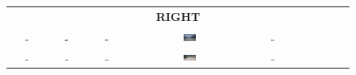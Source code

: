 \begin{figure}
\begin{tabular}{cccccccccc}
        \multicolumn{10}{c}{\textbf{RIGHT}} \\
        \includegraphics[width=0.1\textwidth]{img/diversity/right_01.png} &
        \includegraphics[width=0.1\textwidth]{img/diversity/right_02.png} &
        \includegraphics[width=0.1\textwidth]{img/diversity/right_03.png} &
        \includegraphics[width=0.1\textwidth]{img/diversity/right_04.png} &
        \includegraphics[width=0.1\textwidth]{img/diversity/right_05.png} & \\
        \includegraphics[width=0.1\textwidth]{img/diversity/right_06.png} &
        \includegraphics[width=0.1\textwidth]{img/diversity/right_07.png} &
        \includegraphics[width=0.1\textwidth]{img/diversity/right_08.png} &
        \includegraphics[width=0.1\textwidth]{img/diversity/right_09.png} &
        \includegraphics[width=0.1\textwidth]{img/diversity/right_10.png} \\
    \end{tabular}
    \label{fig:dataset_diversity}
\end{figure}